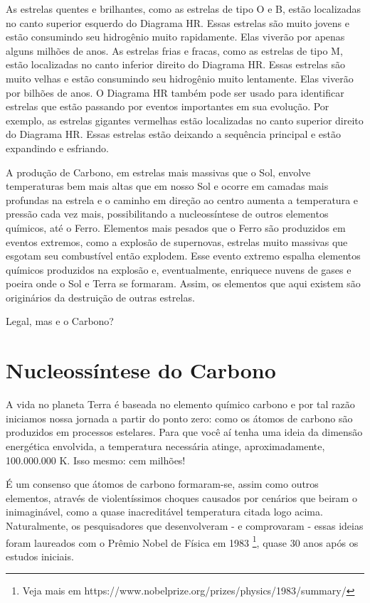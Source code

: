 \documentclass[a4paper,12pt]{book}
\begin{document}
As estrelas quentes e brilhantes, como as estrelas de tipo O e B, estão localizadas no canto superior esquerdo do Diagrama HR. Essas estrelas são muito jovens e estão consumindo seu hidrogênio muito rapidamente. Elas viverão por apenas alguns milhões de anos. As estrelas frias e fracas, como as estrelas de tipo M, estão localizadas no canto inferior direito do Diagrama HR. Essas estrelas são muito velhas e estão consumindo seu hidrogênio muito lentamente. Elas viverão por bilhões de anos. O Diagrama HR também pode ser usado para identificar estrelas que estão passando por eventos importantes em sua evolução. Por exemplo, as estrelas gigantes vermelhas estão localizadas no canto superior direito do Diagrama HR. Essas estrelas estão deixando a sequência principal e estão expandindo e esfriando.

A produção de Carbono, em estrelas mais massivas que o Sol, envolve temperaturas bem mais altas que em nosso Sol e ocorre em camadas mais profundas na estrela e o caminho em direção ao centro aumenta a temperatura e pressão cada vez mais, possibilitando a nucleossíntese de outros elementos químicos, até o Ferro. Elementos mais pesados que o Ferro são produzidos em eventos extremos, como a explosão de supernovas, estrelas muito massivas que esgotam seu combustível então explodem. Esse evento extremo espalha elementos químicos produzidos na explosão e, eventualmente, enriquece nuvens de gases e poeira onde o Sol e Terra se formaram. Assim, os elementos que aqui existem são originários da destruição de outras estrelas.

Legal, mas e o Carbono?

\chapter{Nucleossíntese do Carbono}
A vida no planeta Terra é baseada no elemento químico carbono e por tal razão iniciamos nossa jornada a partir do ponto zero: como os átomos de carbono são produzidos em processos estelares. Para que você aí tenha uma ideia da dimensão energética envolvida, a temperatura necessária atinge, aproximadamente, 100.000.000 K. Isso mesmo: cem milhões!

É um consenso que átomos de carbono formaram-se, assim como outros elementos, através de violentíssimos choques causados por cenários que beiram o inimaginável, como a quase inacreditável temperatura citada logo acima. Naturalmente, os pesquisadores que desenvolveram - e comprovaram - essas ideias foram laureados com o Prêmio Nobel de Física em 1983 \footnote{Veja mais em https://www.nobelprize.org/prizes/physics/1983/summary/}, quase 30 anos após os estudos iniciais.
\end{document}
